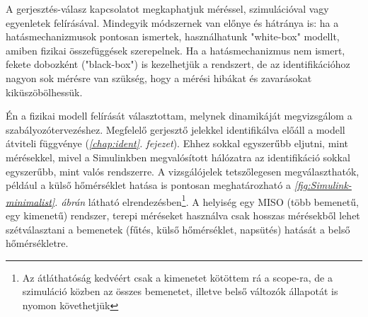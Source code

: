 
A gerjesztés-válasz kapcsolatot megkaphatjuk méréssel, szimulációval vagy egyenletek felírásával. Mindegyik módszernek van előnye és hátránya is:  ha a hatásmechanizmusok pontosan ismertek, használhatunk "white-box" modellt, amiben fizikai összefüggések szerepelnek. Ha a hatásmechanizmus nem ismert, fekete dobozként ("black-box") is kezelhetjük a rendszert, de az identifikációhoz nagyon sok mérésre van szükség, hogy a mérési hibákat és zavarásokat kiküszöbölhessük.%

Én a fizikai modell felírását választottam, melynek dinamikáját megvizsgálom a szabályozótervezéshez. Megfelelő gerjesztő jelekkel identifikálva előáll a modell átviteli függvénye (\textit{\ref{chap:ident}. fejezet}). Ehhez sokkal egyszerűbb eljutni, mint mérésekkel, mivel a Simulinkben megvalósított hálózatra az identifikáció sokkal egyszerűbb, mint valós rendszerre. A vizsgálójelek tetszőlegesen megválaszthatók, például a külső hőmérséklet hatása is pontosan meghatározható a \textit{\ref{fig:Simulink-minimalist}. ábrán} látható elrendezésben\footnote{Az átláthatóság kedvéért csak a kimenetet kötöttem rá a scope-ra, de a szimuláció közben az összes bemenetet, illetve belső változók állapotát is nyomon követhetjük}. A helyiség egy MISO (több bemenetű, egy kimenetű) rendszer, terepi méréseket használva csak hosszas mérésekből lehet szétválasztani a bemenetek (fűtés, külső hőmérséklet, napsütés) hatását a belső hőmérsékletre.






%

